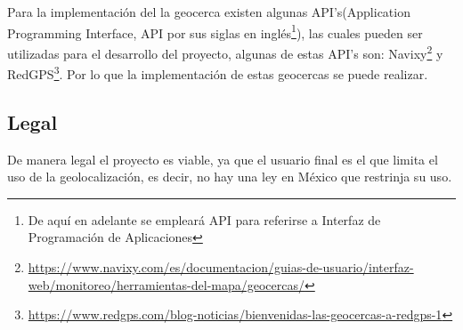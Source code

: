 Para la implementación del la geocerca existen algunas API's(Application Programming Interface, API por sus siglas en inglés\footnote{De aquí en adelante se empleará API para referirse a Interfaz de Programación de Aplicaciones}), las cuales pueden ser utilizadas para el desarrollo del proyecto, algunas de estas API's son: Navixy\footnote{\url{https://www.navixy.com/es/documentacion/guias-de-usuario/interfaz-web/monitoreo/herramientas-del-mapa/geocercas/}} y RedGPS\footnote{\url{https://www.redgps.com/blog-noticias/bienvenidas-las-geocercas-a-redgps-1}}. Por lo que la implementación de estas geocercas se puede realizar.

 \subsection{Legal}

De manera legal el proyecto es viable, ya que el usuario final es el que limita el uso de la geolocalización, es decir, no hay una ley en México que restrinja su uso\cite{geolocalizacion}. 
